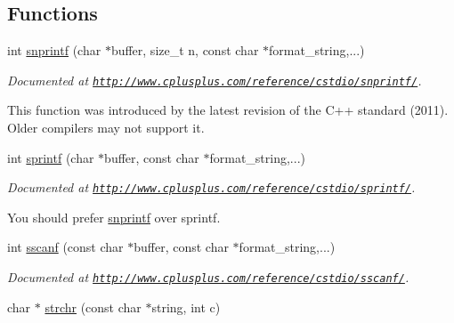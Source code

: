 \subsection*{Functions}
\begin{DoxyCompactItemize}
\item 
\hypertarget{group__string_gac9626ce5468b43d954c3598c1ffe9725}{int \hyperlink{group__string_gac9626ce5468b43d954c3598c1ffe9725}{snprintf} (char $\ast$buffer, size\-\_\-t n, const char $\ast$format\-\_\-string,...)}\label{group__string_gac9626ce5468b43d954c3598c1ffe9725}

\begin{DoxyCompactList}\small\item\em Documented at \href{http://www.cplusplus.com/reference/cstdio/snprintf/}{\tt http\-://www.\-cplusplus.\-com/reference/cstdio/snprintf/}. \par
This function was introduced by the latest revision of the C++ standard (2011). Older compilers may not support it. \end{DoxyCompactList}\item 
\hypertarget{group__string_ga29bf81ae8cf71b6743fec5bcfbe8afcd}{int \hyperlink{group__string_ga29bf81ae8cf71b6743fec5bcfbe8afcd}{sprintf} (char $\ast$buffer, const char $\ast$format\-\_\-string,...)}\label{group__string_ga29bf81ae8cf71b6743fec5bcfbe8afcd}

\begin{DoxyCompactList}\small\item\em Documented at \href{http://www.cplusplus.com/reference/cstdio/sprintf/}{\tt http\-://www.\-cplusplus.\-com/reference/cstdio/sprintf/}. \par
 You should prefer \hyperlink{group__string_gac9626ce5468b43d954c3598c1ffe9725}{snprintf} over sprintf. \end{DoxyCompactList}\item 
\hypertarget{group__string_ga2f4d081856ea28297723b2da1e271a6e}{int \hyperlink{group__string_ga2f4d081856ea28297723b2da1e271a6e}{sscanf} (const char $\ast$buffer, const char $\ast$format\-\_\-string,...)}\label{group__string_ga2f4d081856ea28297723b2da1e271a6e}

\begin{DoxyCompactList}\small\item\em Documented at \href{http://www.cplusplus.com/reference/cstdio/sscanf/}{\tt http\-://www.\-cplusplus.\-com/reference/cstdio/sscanf/}. \end{DoxyCompactList}\item 
\hypertarget{group__string_ga723821951547df8b58d7ddd93fc95306}{char $\ast$ \hyperlink{group__string_ga723821951547df8b58d7ddd93fc95306}{strchr} (const char $\ast$string, int c)}\label{group__string_ga723821951547df8b58d7ddd93fc95306}


\end{DoxyCompactItemize}
